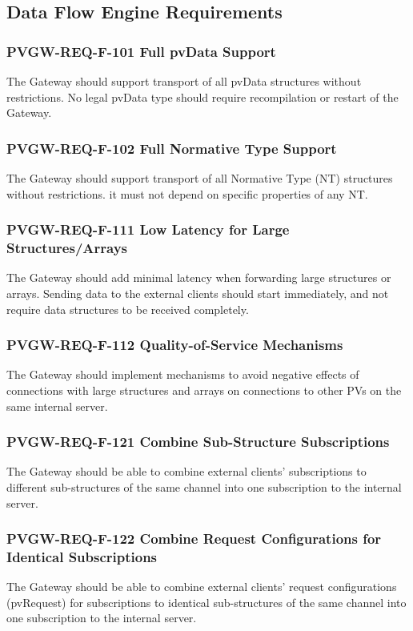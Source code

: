 \documentclass[11pt
  , a4paper
  , article
  , oneside
]{memoir}
\begin{document}
\subsection{Data Flow Engine Requirements}

\subsubsection{PVGW-REQ-F-101 Full pvData Support}
The Gateway should support transport of all pvData structures without restrictions. No legal pvData type should require recompilation or restart of the Gateway.

\subsubsection{PVGW-REQ-F-102 Full Normative Type Support}
The Gateway should support transport of all Normative Type (NT) structures without restrictions. it must not depend on specific properties of any NT.

\subsubsection{PVGW-REQ-F-111 Low Latency for Large Structures/Arrays}
The Gateway should add minimal latency when forwarding large structures or arrays. Sending data to the external clients should start immediately, and not require data structures to be received completely.

\subsubsection{PVGW-REQ-F-112 Quality-of-Service Mechanisms}
The Gateway should implement mechanisms to avoid negative effects of connections with large structures and arrays on connections to other PVs on the same internal server.

\subsubsection{PVGW-REQ-F-121 Combine Sub-Structure Subscriptions}
The Gateway should be able to combine external clients' subscriptions to different sub-structures of the same channel into one subscription to the internal server.

\subsubsection{PVGW-REQ-F-122 Combine Request Configurations for Identical Subscriptions}
The Gateway should be able to combine external clients' request configurations (pvRequest) for subscriptions to identical sub-structures of the same channel into one subscription to the internal server.
\end{document}
